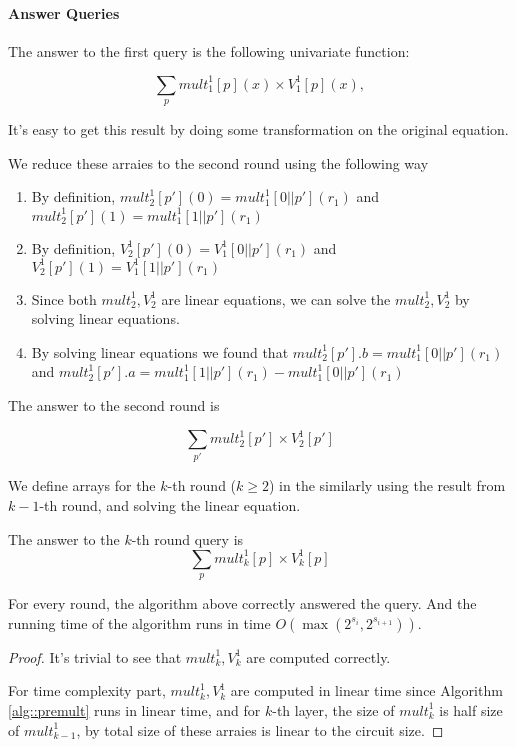 {\paragraph{Answer Queries}
The answer to the first query is the following univariate function:

$$\sum_{p}{mult}_1^1[p](x)\times{V}_1^1[p](x),$$

It's easy to get this result by doing some transformation on the original equation.

We reduce these arraies to the second round using the following way

\begin{enumerate}
	\item By definition, ${mult}_2^1[p'](0)={mult}_1^1[0||p'](r_1)$ and ${mult}_2^1[p'](1)={mult}_1^1[1||p'](r_1)$
	\item By definition, ${V}_2^1[p'](0)={V}_1^1[0||p'](r_1)$ and ${V}_2^1[p'](1)={V}_1^1[1||p'](r_1)$

	\item Since both ${mult}_2^1, {V}_2^1$ are linear equations, we can solve the ${mult}_2^1, {V}_2^1$ by solving linear equations.
	\item By solving linear equations we found that ${mult}_2^1[p'].b={mult}_1^1[0||p'](r_1)$ and ${mult}_2^1[p'].a={mult}_1^1[1||p'](r_1)-{mult}_1^1[0||p'](r_1)$
\end{enumerate}

The answer to the second round is 

$$\sum_{p'}{mult}_2^1[p']\times{V}_2^1[p']$$

We define arrays for the $k$-th round ($k\ge 2$) in the similarly using the result from $k-1$-th round, and solving the linear equation.

The answer to the $k$-th round query is 
$$\sum_{p}{mult}_k^1[p]\times{V}_k^1[p]$$

\begin{theorem} For every round, the algorithm above correctly answered the query. And the running time of the algorithm runs in time $O(\max(2^{s_i}, 2^{s_{i+1}}))$.
\end{theorem}

\begin{proof}
It's trivial to see that ${mult}_k^1, {V}_k^1$ are computed correctly. 

For time complexity part, ${mult}_k^1, {V}_k^1$ are computed in linear time since Algorithm \ref{alg::premult} runs in linear time, and for $k$-th layer, the size of ${mult}_k^1$ is half size of ${mult}_{k-1}^1$, by total size of these arraies is linear to the circuit size.


\end{proof}}
